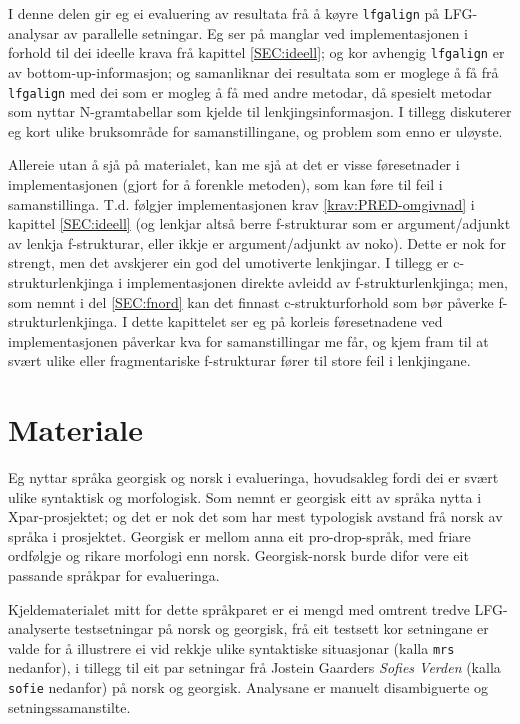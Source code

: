 \documentclass[11pt,a4paper,oneside,draft]{report}
\begin{document}
 I denne delen gir eg ei evaluering av resultata frå å køyre
 \texttt{lfgalign} på LFG-analysar av parallelle setningar. Eg ser på manglar
 ved implementasjonen i forhold til dei ideelle krava frå kapittel
 \ref{SEC:ideell}; og kor avhengig \texttt{lfgalign} er av
 bottom-up-informasjon; og samanliknar dei resultata som er moglege å
 få frå \texttt{lfgalign} med dei som er mogleg å få med andre metodar, då
 spesielt metodar som nyttar N-gramtabellar som kjelde til
 lenkjingsinformasjon. I tillegg diskuterer eg kort ulike bruksområde
 for samanstillingane, og problem som enno er uløyste.

 Allereie utan å sjå på materialet, kan me sjå at det er visse
 føresetnader i implementasjonen (gjort for å forenkle metoden), som
 kan føre til feil i samanstillinga. T.d. følgjer implementasjonen
 krav \ref{krav:PRED-omgivnad} i kapittel \ref{SEC:ideell} (og lenkjar
 altså berre f-strukturar som er argument/adjunkt av lenkja
 f-strukturar, eller ikkje er argument/adjunkt av noko). Dette er nok
 for strengt, men det avskjerer ein god del umotiverte lenkjingar. I
 tillegg er c-strukturlenkjinga i implementasjonen direkte avleidd av
 f-strukturlenkjinga; men, som nemnt i del \ref{SEC:fnord} kan det
 finnast c-strukturforhold som bør påverke f-strukturlenkjinga. I
 dette kapittelet ser eg på korleis føresetnadene ved implementasjonen
 påverkar kva for samanstillingar me får, og kjem fram til at svært
 ulike eller fragmentariske f-strukturar fører til store feil i
 lenkjingane.
 
\section{Materiale}
\label{sec-5.1}

 Eg nyttar språka georgisk og norsk i evalueringa, hovudsakleg fordi
 dei er svært ulike syntaktisk og morfologisk. Som nemnt er georgisk
 eitt av språka nytta i Xpar-prosjektet; og det er nok det som har
 mest typologisk avstand frå norsk av språka i prosjektet.  Georgisk
 er mellom anna eit pro-drop-språk, med friare ordfølgje og rikare
 morfologi enn norsk. Georgisk-norsk burde difor vere eit passande
 språkpar for evalueringa.

 Kjeldematerialet mitt for dette språkparet er ei mengd med
 omtrent tredve LFG-analyserte testsetningar på norsk og georgisk, frå
 eit testsett kor setningane er valde for å illustrere ei vid rekkje
 ulike syntaktiske situasjonar (kalla \texttt{mrs} nedanfor), i tillegg til
 eit par setningar frå Jostein Gaarders \emph{Sofies Verden} (kalla \texttt{sofie}
 nedanfor) på norsk og georgisk. Analysane er manuelt disambiguerte og
 setningssamanstilte.
\end{document}
